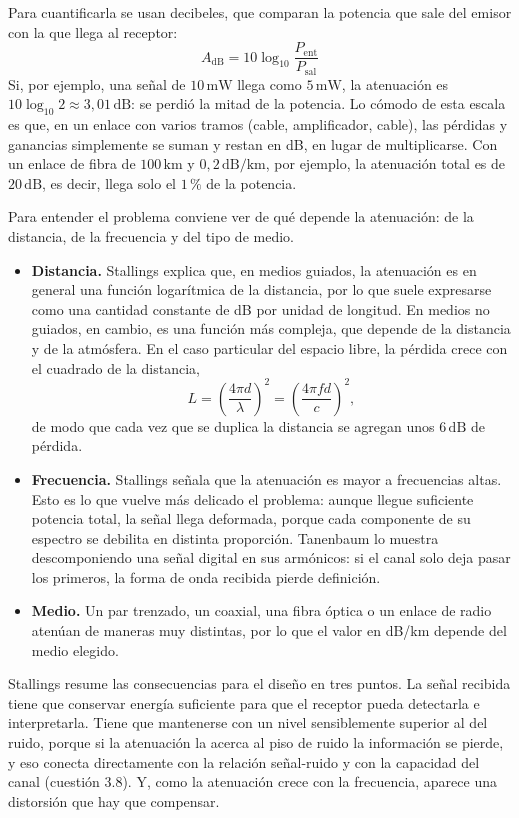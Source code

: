 \documentclass[11pt,a4paper]{article}
\begin{document}
Para cuantificarla se usan decibeles, que comparan la potencia que sale del emisor con la que llega al receptor:
\[
  A_{\mathrm{dB}} = 10\log_{10}\frac{P_{\mathrm{ent}}}{P_{\mathrm{sal}}}
\]
Si, por ejemplo, una señal de $10\,\mathrm{mW}$ llega como $5\,\mathrm{mW}$, la atenuación es $10\log_{10}2\approx3{,}01\,\mathrm{dB}$: se perdió la mitad de la potencia. Lo cómodo de esta escala es que, en un enlace con varios tramos (cable, amplificador, cable), las pérdidas y ganancias simplemente se suman y restan en dB, en lugar de multiplicarse. Con un enlace de fibra de $100\,\mathrm{km}$ y $0{,}2\,\mathrm{dB/km}$, por ejemplo, la atenuación total es de $20\,\mathrm{dB}$, es decir, llega solo el $1\,\%$ de la potencia.

Para entender el problema conviene ver de qué depende la atenuación: de la distancia, de la frecuencia y del tipo de medio.
\begin{itemize}
  \item \textbf{Distancia.} Stallings explica que, en medios guiados, la atenuación es en general una función logarítmica de la distancia, por lo que suele expresarse como una cantidad constante de dB por unidad de longitud. En medios no guiados, en cambio, es una función más compleja, que depende de la distancia y de la atmósfera. En el caso particular del espacio libre, la pérdida crece con el cuadrado de la distancia,
  \[
    L=\left(\frac{4\pi d}{\lambda}\right)^{2}=\left(\frac{4\pi f d}{c}\right)^{2},
  \]
  de modo que cada vez que se duplica la distancia se agregan unos $6\,\mathrm{dB}$ de pérdida.
  \item \textbf{Frecuencia.} Stallings señala que la atenuación es mayor a frecuencias altas. Esto es lo que vuelve más delicado el problema: aunque llegue suficiente potencia total, la señal llega deformada, porque cada componente de su espectro se debilita en distinta proporción. Tanenbaum lo muestra descomponiendo una señal digital en sus armónicos: si el canal solo deja pasar los primeros, la forma de onda recibida pierde definición.
  \item \textbf{Medio.} Un par trenzado, un coaxial, una fibra óptica o un enlace de radio atenúan de maneras muy distintas, por lo que el valor en dB/km depende del medio elegido.
\end{itemize}

Stallings resume las consecuencias para el diseño en tres puntos. La señal recibida tiene que conservar energía suficiente para que el receptor pueda detectarla e interpretarla. Tiene que mantenerse con un nivel sensiblemente superior al del ruido, porque si la atenuación la acerca al piso de ruido la información se pierde, y eso conecta directamente con la relación señal-ruido y con la capacidad del canal (cuestión 3.8). Y, como la atenuación crece con la frecuencia, aparece una distorsión que hay que compensar.
\end{document}
